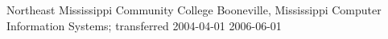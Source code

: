 \educationitem
    {Northeast Mississippi Community College}
    {Booneville, Mississippi}
    {Computer Information Systems; transferred}
    {2004-04-01}
    {2006-06-01}
